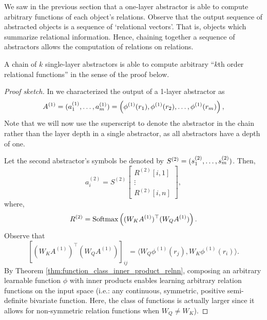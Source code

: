 We saw in the previous section that a one-layer abstractor is able to compute arbitrary functions  of each object's relations. Observe that the output sequence of abstracted objects is a sequence of `relational vectors'. That is, objects which summarize relational information. Hence, chaining together a sequence of  abstractors allows the computation of relations on relations.

\begin{lemma}
	\label{lemma:function_class_composed_abstractors}
	A chain of \(k\) single-layer  abstractors is able to compute arbitrary ``\(k\)th order relational functions'' in the sense of the proof below.
\end{lemma}
\begin{proof}[Proof sketch]
	In  we characterized the output of a 1-layer abstractor as
	\begin{equation*}
		A^{(1)} = (a_1^{(1)}, \ldots, a_\m^{(1)}) = \left(\phi^{(1)}(r_1), \phi^{(1)}(r_2), \ldots, \phi^{(1)}(r_\m)\right),
	\end{equation*}
	Note that we will now use the superscript to denote the abstractor in the chain rather than the layer depth in a single  abstractor, as all  abstractors have a depth of one.

	Let the second abstractor's symbols be denoted by \(S^{(2)} = (s_1^{(2)}, \ldots, s_m^{(2)})\). Then,
	\begin{equation*}
		a_i^{(2)} = S^{(2)} \begin{bmatrix}R^{(2)}[i,1] \\ \vdots \\ R^{(2)}[i,n]\end{bmatrix},
	\end{equation*}
	where,
	\begin{equation*}
		R^{(2)} = \Softmax\left((W_K A^{(1)})^\top (W_Q A^{(1)})\right).
	\end{equation*}
	Observe that
	\begin{equation*}
		\left[(W_K A^{(1)})^\top (W_Q A^{(1)})\right]_{ij} = \langle W_Q \phi^{(1)}(r_j), W_K \phi^{(1)}(r_i) \rangle.
	\end{equation*}
	By Theorem \ref{thm:function_class_inner_product_relnn}, composing an arbitrary learnable function \(\phi\) with inner products enables learning arbitrary relation functions on the input space (i.e.: any continuous, symmetric, positive semi-definite bivariate function. Here, the class of functions is actually larger since it allows for non-symmetric relation functions when \(W_Q \neq W_K\)).


\end{proof}
